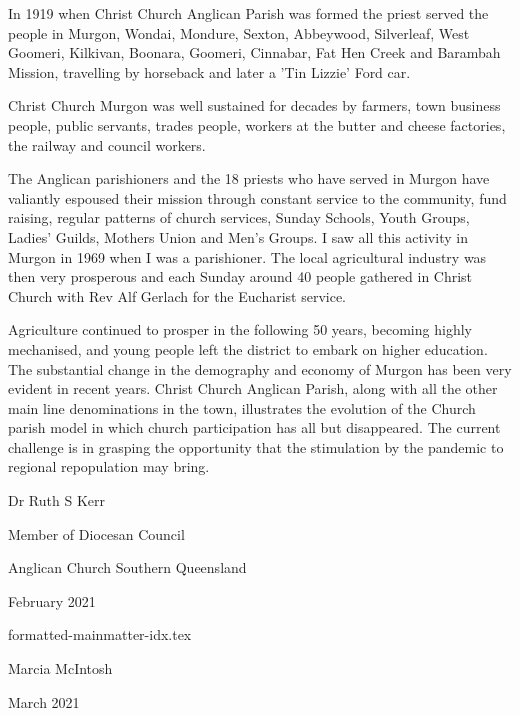 \documentclass[a4paper,11pt,parskip=never,DIV=8,chapterprefix=true,titlepage=true,twoside,twocolumn,open=any]{scrbook}
\begin{document}
In 1919 when Christ Church Anglican Parish was formed the priest served the people in 
Murgon, Wondai, Mondure, Sexton, Abbeywood, Silverleaf, West Goomeri, Kilkivan, Boonara, 
Goomeri, Cinnabar, Fat Hen Creek and Barambah Mission, travelling by horseback and later 
a 'Tin Lizzie' Ford car. 

Christ Church Murgon was well sustained for decades by farmers, town business people, 
public servants, trades people, workers at the butter and cheese factories, the railway 
and council workers. 
\balance

The Anglican parishioners and the 18 priests who have served in Murgon have valiantly 
espoused their mission through constant service to the community, fund raising, regular 
patterns of church services, Sunday Schools, Youth Groups, Ladies' Guilds, Mothers Union 
and Men's Groups. I saw all this activity in Murgon in 1969 when I was a parishioner. The 
local agricultural industry was then very prosperous and each Sunday around 40 people gathered 
in Christ Church with Rev Alf Gerlach for the Eucharist service. 

Agriculture continued to prosper in the following 50 years, becoming highly mechanised, 
and young people left the district to embark on higher education. The substantial change 
in the demography and economy of Murgon has been very evident in recent years. Christ Church 
Anglican Parish, along with all the other main line denominations in the town, illustrates the 
evolution of the Church parish model in which church participation has all but disappeared. 
The current challenge is in grasping the opportunity that the stimulation by the pandemic 
to regional repopulation may bring.

\vspace{1.5cm}
\noindent Dr Ruth S Kerr
\vspace{5mm}

\noindent Member of Diocesan Council

\noindent Anglican Church Southern Queensland

 February 2021

{formatted-mainmatter-idx.tex}

\vspace{1.5cm}
\noindent Marcia McIntosh
\vspace{5mm}

\noindent March 2021

\printindex
\end{document}
